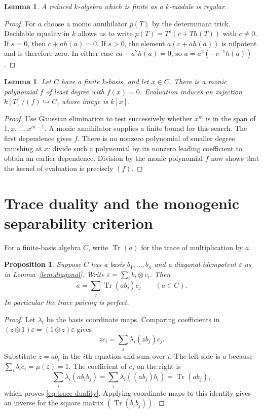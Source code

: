 \documentclass[11pt]{article}
\newtheorem{proposition}[theorem]{Proposition}
\newtheorem{lemma}[theorem]{Lemma}
\theoremstyle{definition}
\theoremstyle{remark}
\newcommand{\Tr}{\operatorname{Tr}}
\newcommand{\eps}{\varepsilon}
\begin{document}
\begin{lemma}\label{lem:reduced-regular}
A reduced $k$-algebra which is finite as a $k$-module is regular.
\end{lemma}
\begin{proof}
For $a$ choose a monic annihilator $p(T)$ by the determinant trick.
Decidable equality in $k$ allows us to write
$p(T)=T^s(c+Th(T))$ with $c\ne0$.
If $s=0$, then $c+ah(a)=0$. If $s>0$, the element
$a(c+ah(a))$ is nilpotent and is therefore zero.
In either case $ca+a^2h(a)=0$, so
$a=a^2(-c^{-1}h(a))$.
\end{proof}

\begin{lemma}\label{lem:minimal}
Let $C$ have a finite $k$-basis, and let $x\in C$. There is a monic
polynomial $f$ of least degree with $f(x)=0$. Evaluation induces an
injection $k[T]/(f)\hookrightarrow C$, whose image is $k[x]$.
\end{lemma}
\begin{proof}
Use Gaussian elimination to test successively whether $x^m$ is in
the span of $1,x,\ldots,x^{m-1}$. A monic annihilator supplies a finite
bound for this search. The first dependence gives $f$. There is no
nonzero polynomial of smaller degree vanishing at $x$: divide such
a polynomial by its nonzero leading coefficient to obtain an earlier
dependence. Division by the monic polynomial $f$ now shows that the
kernel of evaluation is precisely $(f)$.
\end{proof}

\section{Trace duality and the monogenic separability criterion}

For a finite-basis algebra $C$, write $\Tr(a)$ for the trace of
multiplication by $a$.

\begin{proposition}\label{prop:trace}
Suppose $C$ has a basis $b_1,\ldots,b_n$ and a diagonal idempotent
$\eps$ as in Lemma~\ref{lem:diagonal}. Write
$\eps=\sum_i b_i\otimes c_i$. Then
\begin{equation}\label{eq:trace-duality}
 a=\sum_j\Tr(ab_j)c_j\qquad(a\in C).
\end{equation}
In particular the trace pairing is perfect.
\end{proposition}
\begin{proof}
Let $\lambda_i$ be the basis coordinate maps. Comparing coefficients
in $(z\otimes1)\eps=(1\otimes z)\eps$ gives
\[
 zc_i=\sum_j\lambda_i(zb_j)c_j.
\]
Substitute $z=ab_i$ in the $i$th equation and sum over $i$.
The left side is $a$ because $\sum_i b_ic_i=\mu(\eps)=1$.
The coefficient of $c_j$ on the right is
\[
 \sum_i\lambda_i(ab_i b_j)
   =\sum_i\lambda_i((ab_j)b_i)=\Tr(ab_j),
\]
which proves \eqref{eq:trace-duality}. Applying coordinate maps to
this identity gives an inverse for the square matrix
$(\Tr(b_i b_j))$.
\end{proof}
\end{document}
